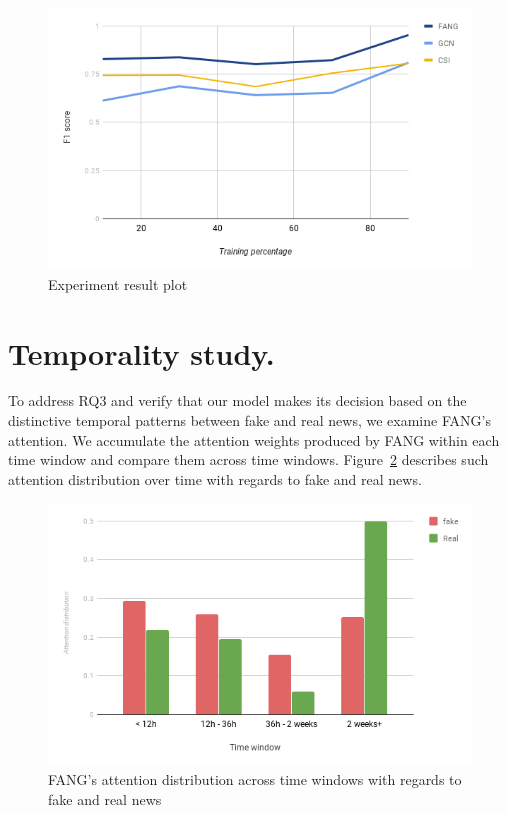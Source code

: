\documentclass[fyp]{socreport}
\theoremstyle{definition}
\theoremstyle{hypothesis}
\begin{document}
\begin{figure}[ht]
\centering
\includegraphics[scale=0.7]{limited_data.png}
\caption{Experiment result plot}
\label{fig:limited_data}
\end{figure}

\section{Temporality study.} To address RQ3 and verify that our model makes its decision based on the distinctive temporal patterns between fake and real news, we examine FANG's attention. We accumulate the attention weights produced by FANG within each time window and compare them across time windows. Figure~\ref{fig:fang_attention} describes such attention distribution over time with regards to fake and real news.

\begin{figure}[ht]
\centering
\includegraphics[scale=0.7]{fang_attention.png}
\caption{FANG's attention distribution across time windows with regards to fake and real news}
\label{fig:fang_attention}
\end{figure}
\end{document}
